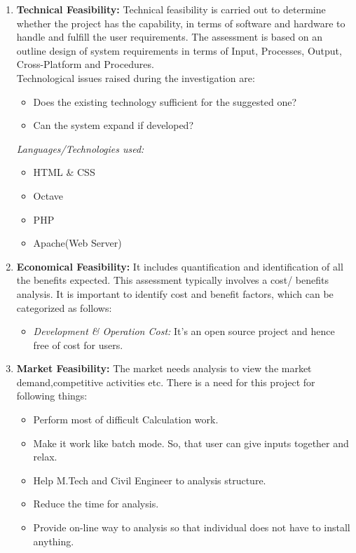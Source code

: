 \begin{enumerate}
	\item \textbf{Technical Feasibility:} Technical feasibility is carried out to determine whether the project has the capability, in terms of software and hardware to handle and fulfill the user requirements. The assessment is based on an outline design of system requirements in terms of Input, Processes, Output, Cross-Platform and Procedures.\\
Technological issues raised during the investigation are:
\begin{itemize}
	\item Does the existing technology sufficient for the suggested one?
	\item Can the system expand if developed?
\end{itemize}
  \emph{Languages/Technologies used:}
\begin{itemize}
\item HTML \& CSS
\item Octave
\item PHP
\item Apache(Web Server)
  \end{itemize}      
	\item \textbf{Economical Feasibility:} It includes quantification and identification of all the benefits expected. This assessment typically involves a cost/ benefits analysis. It is important to identify cost and benefit factors, which can be categorized as follows:
\begin{itemize}
\item  \emph{Development \& Operation Cost:} It's an open source project and hence free of cost for users.
\end{itemize}
	\item \textbf{Market Feasibility:} The market needs analysis to view the market demand,competitive activities etc. There is a need for this project for following things:
\begin{itemize}
\item Perform most of difficult Calculation work.
\item  Make it work like batch mode. So, that user can give inputs together and relax.
\item  Help M.Tech and Civil Engineer to analysis structure.
\item Reduce the time for analysis.
\item Provide on-line way to analysis so that individual does not have to install anything.
\end{itemize}

\end{enumerate}
